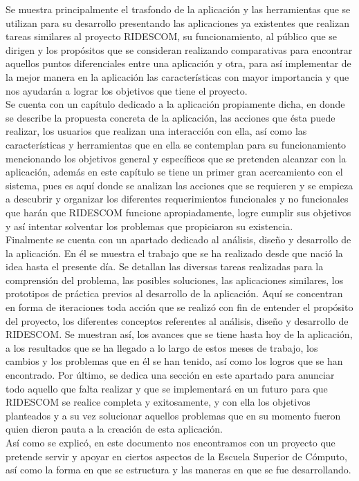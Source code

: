 	Se muestra principalmente el trasfondo de la aplicación y las herramientas que se utilizan para su desarrollo  presentando las aplicaciones ya existentes que realizan tareas similares al proyecto RIDESCOM, su funcionamiento, al público que se dirigen y los propósitos que se consideran realizando comparativas para encontrar aquellos puntos diferenciales entre una aplicación y otra, para así implementar de la mejor manera en la aplicación las características con mayor importancia y que nos ayudarán a lograr los objetivos
	que tiene el proyecto.\\
	Se cuenta con un capítulo dedicado a la aplicación propiamente dicha, en donde se describe la propuesta concreta de la aplicación, las acciones que ésta puede realizar, los usuarios que realizan una interacción con ella, así como las características y herramientas que en ella se contemplan para su funcionamiento mencionando los objetivos general y específicos que se pretenden alcanzar con la aplicación, además en este capítulo se tiene un primer gran acercamiento con el sistema, pues es aquí donde se analizan las acciones que se requieren y se empieza a descubrir y organizar los diferentes requerimientos funcionales y no funcionales que harán que RIDESCOM funcione apropiadamente, logre cumplir sus objetivos y así intentar solventar los problemas que propiciaron su existencia.\\
	Finalmente se cuenta con un apartado dedicado al análisis, diseño y desarrollo de la aplicación. En él se muestra el trabajo que se ha realizado desde que nació la idea hasta el presente día. Se detallan las diversas tareas realizadas para la comprensión del problema, las posibles soluciones, las aplicaciones similares, los prototipos de práctica previos al desarrollo de la aplicación. Aquí se concentran en forma de iteraciones toda acción que se realizó con fin de entender el propósito del proyecto, los diferentes conceptos referentes al análisis, diseño y desarrollo de RIDESCOM. Se muestran así, los avances que se tiene hasta hoy de la aplicación, a los resultados que se ha llegado a lo largo de estos meses de trabajo, los cambios y los problemas que en él se han tenido, así como los logros que se han encontrado. Por último, se dedica una sección en este apartado para anunciar todo aquello que falta realizar y que se implementará en un futuro para que RIDESCOM se realice completa y exitosamente, y con ella los objetivos planteados y a su vez solucionar aquellos problemas que en su momento fueron quien dieron pauta a la creación de esta aplicación.\\
	Así como se explicó, en este documento nos encontramos con un proyecto que pretende servir y apoyar en ciertos aspectos de la Escuela Superior de Cómputo, así como la forma en que se estructura y las maneras en que se fue desarrollando.
	
